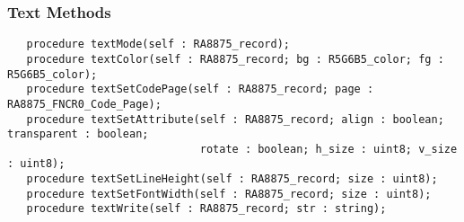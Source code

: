 \documentclass[10pt, openany]{book}
\begin{document}
\subsubsection{Text Methods}
\begin{lstlisting}
   procedure textMode(self : RA8875_record);
   procedure textColor(self : RA8875_record; bg : R5G6B5_color; fg : R5G6B5_color);
   procedure textSetCodePage(self : RA8875_record; page : RA8875_FNCR0_Code_Page);
   procedure textSetAttribute(self : RA8875_record; align : boolean; transparent : boolean;
                              rotate : boolean; h_size : uint8; v_size : uint8);
   procedure textSetLineHeight(self : RA8875_record; size : uint8);
   procedure textSetFontWidth(self : RA8875_record; size : uint8);
   procedure textWrite(self : RA8875_record; str : string);
\end{lstlisting}
\end{document}
